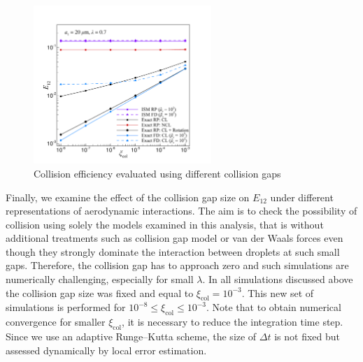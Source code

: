 \documentclass[../thesis.tex]{subfiles}
\begin{document}
\begin{figure}%
\center
\includegraphics[trim=05mm 05mm 25mm 20mm, clip, width=0.6\textwidth]{../figs/PRF/fig9.pdf}
\caption{Collision efficiency evaluated using different collision gaps}
\label{fig:cut}
\end{figure}%
Finally, we examine the effect of the collision gap size on $E_{12}$ under different representations of aerodynamic interactions. The aim is to check the possibility of collision using solely the models examined in this analysis, that is without additional treatments such as collision gap model or van der Waals forces even though they strongly dominate the interaction between droplets at such small gaps. Therefore, the collision gap has to approach zero and such simulations are numerically challenging, especially for small $\lambda$. In all simulations discussed above the collision gap size was fixed and equal to $\xi_\text{col}=10^{-3}$. This new set of simulations is performed for $10^{-8}\leq\xi_\text{col}\leq10^{-3}$. Note that to obtain numerical convergence for smaller $\xi_\text{col}$, it is necessary to reduce the integration time step. Since we use an adaptive Runge--Kutta scheme, the size of $\Delta t$ is not fixed but assessed dynamically by local error estimation.
\end{document}
